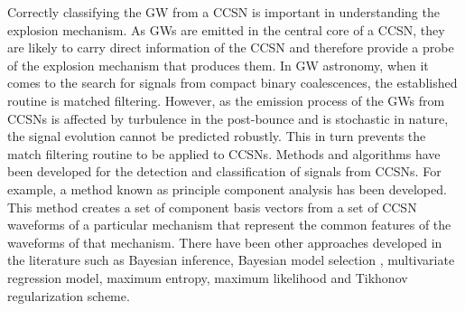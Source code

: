 \documentclass[aps,twocolumn,showpacs,groupedaddress, nofootinbib]{revtex4}  %
\begin{document}
Correctly classifying the \ac{GW} from a \ac{CCSN} is important in understanding the explosion mechanism.
As \acp{GW} are emitted in the central core of a \ac{CCSN}, 
they are likely to carry direct information of the \ac{CCSN} and therefore provide a probe of the explosion mechanism that produces them.
In \ac{GW} astronomy, when it comes to the search for signals from compact binary coalescences, the established routine is matched filtering.
However, as the emission process of the \acp{GW} from \acp{CCSN} is affected by turbulence in the post-bounce and is stochastic in nature,  
the signal evolution cannot be predicted robustly\cite{ott2009gravitational, kotake2013multiple, kotake2009stochastic}.
This in turn prevents the match filtering routine to be applied to \acp{CCSN}.
Methods and algorithms have been developed for the detection and classification of signals from \acp{CCSN}. 
For example, a method known as principle component analysis has been developed\cite{heng2009rotating, rover2009bayesian, powell2015classification, powell2017classification, suvorova2019reconstructing}.
This method creates a set of component basis vectors from a set of \ac{CCSN} waveforms of a particular mechanism
that represent the common features of the waveforms of that mechanism.
There have been other approaches developed in the literature such as Bayesian inference\cite{rover2009bayesian}, Bayesian model selection\cite{logue2012inferring}
, multivariate regression model\cite{engels2014multivariate}, maximum entropy\cite{summerscales2008maximum}, 
maximum likelihood\cite{gursel1989near} and Tikhonov regularization scheme\cite{rakhmanov2006rank, hayama2007coherent}.  
\end{document}
